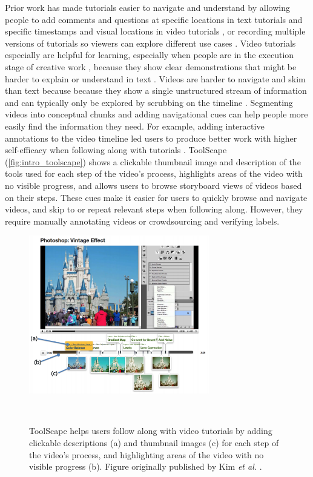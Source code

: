 Prior work has made tutorials easier to navigate and understand by allowing people to add comments and questions at specific locations in text tutorials \cite{Bunt2014} and specific timestamps and visual locations in video tutorials \cite{AlamAnik2015}, or recording multiple versions of tutorials so viewers can explore different use cases \cite{Lafreniere2013}. Video tutorials especially are helpful for learning, especially when people are in the execution stage of creative work \cite{Zhang2019}, because they show clear demonstrations that might be harder to explain or understand in text \cite{Chi2012, Pongnumkul2011, Grossman2010a}. Videos are harder to navigate and skim than text because because they show a single unstructured stream of information and can typically only be explored by scrubbing on the timeline \cite{Pavel2014, Pavel2015, Kim2014}. Segmenting videos into conceptual chunks \cite{Pongnumkul2011, Chi2012, Banovic2012, Nguyen2015, Grossman2010a, Matejka2011} and adding navigational cues \cite{Matejka2011, Grossman2010, Kim2014, Banovic2012, Kim2014a, Pongnumkul2011, Grossman2010a, Chi2012, Pavel2014, Nguyen2015} can help people more easily find the information they need. For example, adding interactive annotations to the video timeline led users to produce better work with higher self-efficacy when following along with tutorials \cite{Kim2014, Kim2013}. ToolScape (\autoref{fig:intro_toolscape}) shows a clickable thumbnail image and description of the tools used for each step of the video's process, highlights areas of the video with no visible progress, and allows users to browse storyboard views of videos based on their steps. These cues make it easier for users to quickly browse and navigate videos, and skip to or repeat relevant steps when following along. However, they require manually annotating videos or crowdsourcing and verifying labels.

\begin{figure}[t!]
\centering
  \includegraphics[width=0.7\textwidth]{figures/toolscape.png}
  \caption{ToolScape helps users follow along with video tutorials by adding clickable descriptions (a) and thumbnail images (c) for each step of the video’s process, and highlighting areas of the video with no visible progress (b). Figure originally published by Kim \textit{et al.} \cite{Kim2014}.}~\label{fig:intro_toolscape}
\end{figure}

